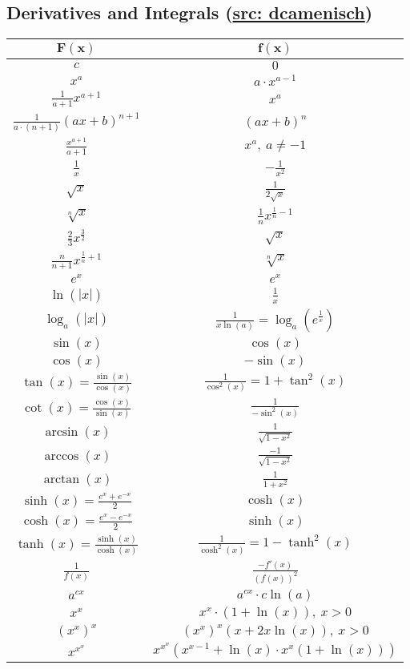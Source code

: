 \documentclass[a4paper, 10pt]{article}
\theoremstyle{definition}
\begin{document}
\subsection*{Derivatives and Integrals (\href{https://n.ethz.ch/~dcamenisch/summaries/}{src: dcamenisch})}
\renewcommand{\arraystretch}{1.5}
\begin{center}
\begin{tabular}{c|c}
    $\mathbf{F(x)}$ & $\mathbf{f(x)}$ \\
    \midrule
    $c$ & $0$ \\
    $x^a$ & $a \cdot x^{a - 1}$ \\
    $\frac{1}{a+1} x^{a + 1}$ & $x^a$ \\
    $\frac{1}{a \cdot (n + 1)} (ax + b)^{n + 1}$ & $(ax + b)^n$ \\
    $\frac{x^{a + 1}}{a + 1}$ & $x^a, \ a \neq -1$ \\
    $\frac{1}{x}$ & $-\frac{1}{x^2}$ \\
    $\sqrt{x}$ & $\frac{1}{2\sqrt{x}}$ \\
    $\sqrt[n]{x}$ & $\frac{1}{n}x^{\frac{1}{n} - 1}$ \\
    $\frac{2}{3}x^{\frac{3}{2}}$ & $\sqrt{x}$ \\
    $\frac{n}{n+1} x^{\frac{1}{n} + 1}$ & $\sqrt[n]{x}$ \\
    $e^x$ & $e^x$ \\
    $\ln(|x|)$ & $\frac{1}{x}$ \\
    $\log_a(|x|)$ & $\frac{1}{x \ln(a)} = \log_a(e^\frac{1}{x})$ \\
    $\sin(x)$ & $\cos(x)$ \\
    $\cos(x)$ & $-\sin(x)$ \\
    $\tan(x) = \frac{\sin(x)}{\cos(x)}$ & $\frac{1}{\cos^2(x)} = 1 + \tan^2(x)$ \\
    $\cot(x) = \frac{\cos(x)}{\sin(x)}$ & $\frac{1}{-\sin^2(x)}$ \\
    $\arcsin(x)$ & $\frac{1}{\sqrt{1 - x^2}}$ \\
    $\arccos(x)$ & $\frac{-1}{\sqrt{1 - x^2}}$ \\
    $\arctan(x)$ & $\frac{1}{1 + x^2}$ \\
    $\sinh(x) = \frac{e^x + e^{-x}}{2}$ & $\cosh(x)$ \\
    $\cosh(x) = \frac{e^x - e^{-x}}{2}$ & $\sinh(x)$ \\
    $\tanh(x) = \frac{\sinh(x)}{\cosh(x)}$ & $\frac{1}{\cosh^2(x)} = 1 - \tanh^2(x)$ \\
    $\frac{1}{f(x)}$ & $\frac{-f'(x)}{(f(x))^2}$ \\
    $a^{cx}$ & $a^{cx} \cdot c \ln(a)$ \\
    $x^x$ & $x^x \cdot (1 + \ln(x)), \ x > 0$ \\
    $(x^x)^x$ & $(x^x)^x (x + 2x \ln(x)), \ x > 0$ \\
    $x^{x^x}$ & $x^{x^x} (x^{x - 1} + \ln(x) \cdot x^x (1 + \ln(x)))$ \\
\end{tabular}


\end{center}
\end{document}
